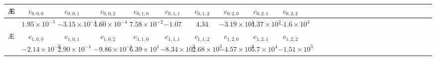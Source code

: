\documentclass[prd,aps,twocolumn,nofootinbib,showpacs,superscriptaddress]{revtex4-1}
\begin{document}
%
{\renewcommand{\arraystretch}{1.2}
\begin{table}
\begin{centering}
\begin{tabular}{cccccccccccccccccccccccccccc}
\hline
\hline
\noalign{\smallskip}
\AE & \multicolumn{1}{c}{$c_{0,0,0}$} 
& \multicolumn{1}{c}{$c_{0,0,1}$} 
& \multicolumn{1}{c}{$c_{0,0,2}$} 
& \multicolumn{1}{c}{$c_{0,1,0}$}
& \multicolumn{1}{c}{$c_{0,1,1}$} 
& \multicolumn{1}{c}{$c_{0,1,2}$} 
& \multicolumn{1}{c}{$c_{0,2,0}$} 
& \multicolumn{1}{c}{$c_{0,2,1}$} 
& \multicolumn{1}{c}{$c_{0,2,2}$} 
\\
%
\hline
\noalign{\smallskip}
& $1.95 \times 10^{-5}$  & 
$-3.15\times 10^{-4}$ & 
$4.60 \times 10^{-4}$ & 
$7.58 \times10^{-2}$ & 
$-1.07$ & 
$4.34$ &
$-3.19 \times 10^{1}$ & 
$4.37 \times 10^2$ & 
$-1.6 \times 10^3$ \\

\noalign{\smallskip}
\AE & \multicolumn{1}{c}{$c_{1,0,0}$}  
& \multicolumn{1}{c}{$c_{1,0,1}$} 
& \multicolumn{1}{c}{$c_{1,0,2}$} 
& \multicolumn{1}{c}{$c_{1,1,0}$}
& \multicolumn{1}{c}{$c_{1,1,1}$}
& \multicolumn{1}{c}{$c_{1,1,2}$} 
& \multicolumn{1}{c}{$c_{1,2,0}$} 
& \multicolumn{1}{c}{$c_{1,2,1}$} 
& \multicolumn{1}{c}{$c_{1,2,2}$} 
\\
\hline
& $-2.14 \times 10^{-2}$ & 
$2.90 \times 10^{-1}$ & 
$-9.86 \times 10^{-1}$ & 
$6.39 \times 10^{1}$ & 
$-8.34 \times 10^2$ & 
$2.68 \times 10^3$ & 
$-4.57 \times 10^{3}$ & 
$5.7 \times 10^{4}$ & 
$-1.51 \times 10^5$ \\


\end{tabular}
\end{centering}
\end{table}}
\end{document}
